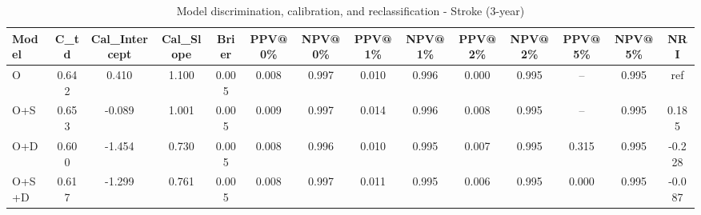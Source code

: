 \begin{table}[htbp]
\centering
\small
\caption{Model discrimination, calibration, and reclassification - Stroke (3-year)}
\label{tab:perf_stroke_3y}
\begin{tabular}{lccccccccccccc}
\toprule
Model & C\_td & Cal\_Intercept & Cal\_Slope & Brier & PPV@0\% & NPV@0\% & PPV@1\% & NPV@1\% & PPV@2\% & NPV@2\% & PPV@5\% & NPV@5\% & NRI \\
\midrule
O & 0.642 & 0.410 & 1.100 & 0.005 & 0.008 & 0.997 & 0.010 & 0.996 & 0.000 & 0.995 & -- & 0.995 & ref \\
O+S & 0.653 & -0.089 & 1.001 & 0.005 & 0.009 & 0.997 & 0.014 & 0.996 & 0.008 & 0.995 & -- & 0.995 & 0.185 \\
O+D & 0.600 & -1.454 & 0.730 & 0.005 & 0.008 & 0.996 & 0.010 & 0.995 & 0.007 & 0.995 & 0.315 & 0.995 & -0.228 \\
O+S+D & 0.617 & -1.299 & 0.761 & 0.005 & 0.008 & 0.997 & 0.011 & 0.995 & 0.006 & 0.995 & 0.000 & 0.995 & -0.087 \\
\bottomrule
\end{tabular}
\end{table}